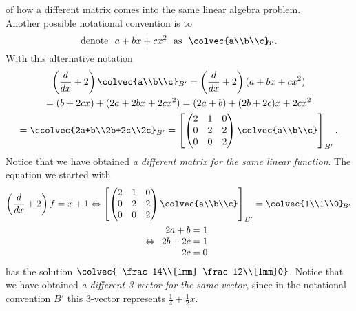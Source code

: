 \begin{example}{of how a different matrix comes into the same linear algebra problem.}\\

\noindent Another possible notational convention  is to
\[\text{denote~~}a+bx+cx^2 \text{~~as~~} \colvec{a\\b\\c}_{\!\!\!B'}.\]
With this alternative notation
\begin{gather*}  \left( \frac{d}{dx}+2\right) \colvec{a\\b\\c}_{B'}
=\left( \frac{d}{dx}+2\right)(a+bx+cx^2)\\
=(b+2cx)+(2a +2bx+2cx^2 ) = (2a+b) + (2b+2c)x+2cx^2
\\
=\ccolvec{2a+b\\2b+2c\\2c}_{B'}
= 
\left[ 
\begin{pmatrix}   
2&1&0\\
0&2&2\\
0&0&2
\end{pmatrix}
\colvec{a\\b\\c}\right]_{B'}.\end{gather*}
Notice that we have obtained {\itshape a different matrix for the same linear function}. 
The  equation we started with 
\begin{gather*}
 \left( \frac{d}{dx}+2\right) f=x+1
 \Leftrightarrow
\left[ 
\begin{pmatrix}   
2&1&0\\
0&2&2\\
0&0&2
\end{pmatrix}
\colvec{a\\b\\c}\right]_{B'} = \colvec{1\\1\\0}_{\!B'}\\
\Leftrightarrow
\begin{array}{r}
2a+b=1\\
2b+2c=1\\
2c=0
\end{array}
\end{gather*}
has the solution 
$\colvec{ \frac14\\[1mm] \frac12\\[1mm]0}$. Notice that we have obtained {\itshape a different 3-vector for the same vector},  since in the notational convention $B'$ this 3-vector represents $\frac14+\frac12x$. 
\end{example}

